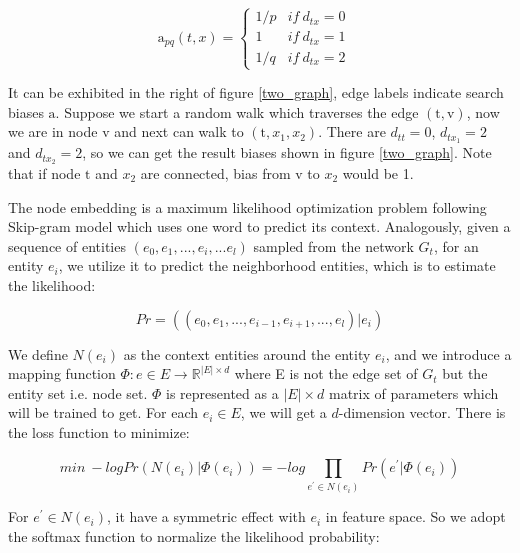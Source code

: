 \begin{small}
    \begin{equation}
        \mathrm{a}_{pq}(t,x) = 
        \left\{\begin{matrix} 1/p & if\ d_{tx}=0
        & \\ 1 & if\ d_{tx}=1
        & \\ 1/q & if\ d_{tx}=2
        \end{matrix}\right.
    \end{equation}
\end{small}It can be exhibited in the right of figure \ref{two_graph}, edge labels indicate search biases $\mathrm{a}$. Suppose we start a random walk
which traverses the edge $(\mathrm{t}, \mathrm{v})$, now we are in node $\mathrm{v}$ and next can walk to $(\mathrm{t}, x_1, x_2)$.
There are $d_{tt}=0$, $d_{tx_1}=2$ and $d_{tx_2}=2$, so we can get the result biases shown in figure \ref{two_graph}.
Note that if node $\mathrm{t}$ and $x_2$ are connected, bias from $\mathrm{v}$ to $x_2$ would be 1.

The node embedding is a maximum likelihood optimization problem following Skip-gram model which uses one
word to predict its context. Analogously, given a sequence of entities $(e_0, e_1, ..., e_i, ...e_l)$ sampled from the network $G_t$,
for an entity $e_i$, we utilize it to predict the neighborhood entities, which is to estimate the likelihood:

\begin{small}
    \begin{equation}
        Pr = ((e_0, e_1, ..., e_{i-1}, e_{i+1}, ..., e_l)|e_i)
    \end{equation}
\end{small}We define $N(e_i)$ as the context entities around the entity $e_i$, and we introduce a mapping function
$\Phi: e \in E \rightarrow \mathbb{R}^{\left | E \right | \times d}$ where E is not the edge set of $G_t$ but the 
entity set i.e. node set. $\Phi$ is represented as a $\left | E \right | \times d$ matrix of parameters which will be
trained to get. For each $e_i \in E$, we will get a $d$-dimension vector. There is the loss function to minimize:

\begin{small}
    \begin{equation}
        min\  -log Pr(N(e_i)|\Phi(e_i)) = -log\prod_{e^{'} \in N(e_i)}^{ }Pr(e^{'}|\Phi(e_i))
    \end{equation}
\end{small}For $e^{'} \in N(e_i)$, it have a symmetric effect with $e_i$ in feature space\cite{kdd/GroverL16}.
So we adopt the softmax function to normalize the likelihood probability:

